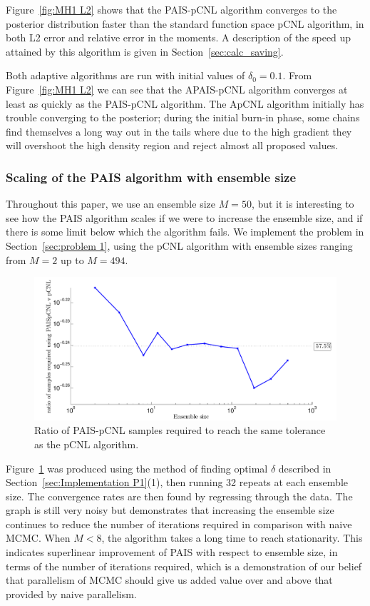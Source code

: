 \documentclass[final]{siamltex}
\begin{document}
Figure~\ref{fig:MH1 L2} shows that the PAIS-pCNL algorithm converges to the posterior distribution faster than the standard function space pCNL algorithm, in both L2 error and relative error in the moments. A description of the speed up attained by this algorithm is given in Section~\ref{sec:calc_saving}.

Both adaptive algorithms are run with initial values of $\delta_0=0.1$. From Figure~\ref{fig:MH1 L2} we can see that the APAIS-pCNL algorithm converges at least as quickly as the PAIS-pCNL algorithm. The ApCNL algorithm initially has trouble converging to the posterior; during the initial burn-in phase, some chains find themselves a long way out in the tails where due to the high gradient they will overshoot the high density region and reject almost all proposed values.

\subsubsection{Scaling of the PAIS algorithm with ensemble size}

Throughout this paper, we use an ensemble size $M=50$, but it is interesting to see how the PAIS algorithm scales if we were to increase the ensemble size, and if there is some limit below which the algorithm fails. We implement the problem in Section~\ref{sec:problem 1}, using the pCNL algorithm with ensemble sizes ranging from $M=2$ up to $M=494$.

\begin{figure}[h]
\begin{center}
\includegraphics[width=\textwidth]{"figures/PAIS_saving"}
\caption{Ratio of PAIS-pCNL samples required to reach the same tolerance as the pCNL algorithm.}
\label{fig:PAIS_saving}
\end{center}
\end{figure}

Figure~\ref{fig:PAIS_saving} was produced using the method of finding
optimal $\delta$ described in Section~\ref{sec:Implementation P1}(1),
then running 32 repeats at each ensemble size. The convergence rates
are then found by regressing through the data. The graph is still very
noisy but demonstrates that increasing the ensemble size continues to
reduce the number of iterations required in comparison with naive
MCMC. When $M<8$, the algorithm takes a long time to reach
stationarity. This indicates superlinear improvement of PAIS with
respect to ensemble size, in terms of the number of iterations
required, which is a demonstration of our belief that parallelism of
MCMC should give us added value over and above that provided by naive parallelism.
\end{document}
